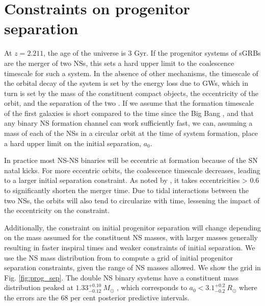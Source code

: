 \documentclass{aa}    %
\begin{document}
\section{Constraints on progenitor separation}

At $z = 2.211$, the age of the universe is 3 Gyr. If the progenitor systems of
sGRBs are the merger of two NSs, this sets a hard upper limit to the coalescence
timescale for such a system. In the absence of other mechanisms, the timescale
of the orbital decay of the system is set by the energy loss due to
GWs, which in turn is set by the mass of the constituent compact
objects, the eccentricity of the orbit, and the separation of the two
\citep{Postnov2014}. If we assume that the formation timescale of the first
galaxies is short compared to the time since the Big Bang \citep{Richard2011},
and that any binary NS formation channel can work sufficiently fast,
we can, assuming a mass of each of the NSs in a circular orbit at the time of
system formation, place a hard upper limit on the initial separation, $a_0$.

In practice most NS-NS binaries will be eccentric at formation because of the SN
natal kicks. For more eccentric orbits, the coalescence timescale decreases,
leading to a larger initial separation constraint. As noted by
\citet{Postnov2014}, it takes eccentricities > 0.6 to significantly shorten the
merger time. Due to tidal interactions between the two NSs, the orbits will also
tend to circularize with time, lessening the impact of the eccentricity on the
constraint.

Additionally, the constraint on initial progenitor separation will change
depending on the mass assumed for the constituent NS masses, with larger masses
generally resulting in faster inspiral times and weaker constraints of initial
separation. We use the NS mass distribution from \citet{Kiziltan2013} to compute
a grid of initial progenitor separation constraints, given the range of NS
masses allowed. We show the grid in Fig. \ref{fig:prog_sep}. The double NS
binary systems have a constituent mass distribution peaked at
$1.33^{+0.10}_{-0.12}~M_\odot$ \citep{Kiziltan2013}, which corresponds to  $a_0 <
3.1^{+0.2}_{-0.2}~R_\odot$ where the errors are the 68 per cent posterior
predictive intervals.
\end{document}
